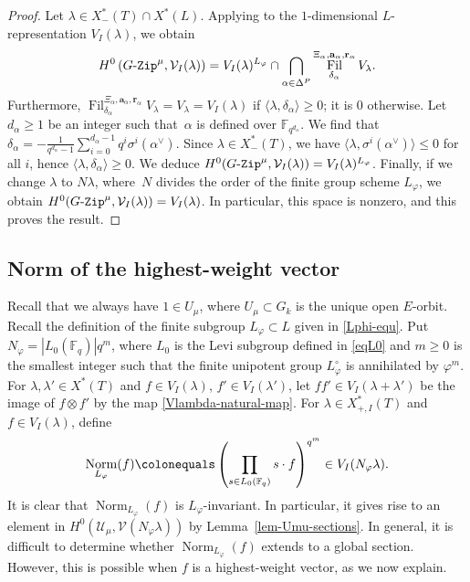 \documentclass[11pt]{amsart}
\numberwithin{equation}{section}
\theoremstyle{definition}
\theoremstyle{remark}
\newcommand{\GZip}{\mathop{\text{$G$-{\tt Zip}}}\nolimits}
\newcommand{\Ucal}{{\mathcal U}}
\newcommand{\Vcal}{{\mathcal V}}
\newcommand{\FF}{\mathbb{F}}
\DeclareMathOperator{\fil}{Fil}
\DeclareMathOperator{\Norm}{Norm}
\begin{document}
\begin{proof}
Let $\lambda \in X^*_{-}(T) \cap X^*(L)$. Applying \cite[Theorem 3.4.1]{Imai-Koskivirta-vector-bundles} to the $1$-dimensional $L$-representation $V_I(\lambda)$, we obtain 
\begin{equation}
H^0\left(\GZip^\mu,\Vcal_I(\lambda)\right)=V_I(\lambda)^{L_{\varphi}}\cap 
 \bigcap_{\alpha \in \Delta^P} 
 \fil_{\delta_{\alpha}}^{\Xi_{\alpha},\mathbf{a}_{\alpha},\mathbf{r}_{\alpha}} V_{\lambda}.
\end{equation}
Furthermore, $\fil_{\delta_{\alpha}}^{\Xi_{\alpha},\mathbf{a}_{\alpha},\mathbf{r}_{\alpha}} V_{\lambda}=V_\lambda=V_I(\lambda)$ if $\langle \lambda, \delta_\alpha \rangle \geq 0$; it is $0$ otherwise. Let $d_\alpha\geq 1$ be an integer such that~$\alpha$ is defined over $\FF_{q^{d_\alpha}}$. We find that $\delta_\alpha=-\frac{1}{q^{d_\alpha}-1}\sum_{i=0}^{d_\alpha-1} q^i \sigma^i(\alpha^\vee)$. Since $\lambda\in X^*_{-}(T)$, we have $\langle \lambda , \sigma^{i}(\alpha^\vee) \rangle \leq 0$ for all $i$, hence $\langle \lambda, \delta_\alpha \rangle \geq 0$. We deduce  $H^0(\GZip^\mu,\Vcal_I(\lambda))=V_I(\lambda)^{L_{\varphi}}$. Finally, if we change $\lambda$ to $N\lambda$, where~$N$ divides the order of the finite group scheme $L_\varphi$, we obtain $H^0(\GZip^\mu,\Vcal_I(\lambda))=V_I(\lambda)$. In particular, this space is nonzero, and this proves the result.
\end{proof}

\subsection{Norm of the highest-weight vector}\label{subsec-norm}

Recall that we always have $1\in U_\mu$, where $U_{\mu}\subset G_k$ is the unique open $E$-orbit. Recall the definition of the finite subgroup $L_\varphi\subset L$ given in \eqref{Lphi-equ}. Put $N_\varphi=|L_0(\FF_q)|q^m$, where $L_0$ is the Levi subgroup defined in \eqref{eqL0} and $m\geq 0$ is the smallest integer such that the finite unipotent group $L_\varphi^{\circ}$ is annihilated by $\varphi^m$. For $\lambda,\lambda'\in X^*(T)$ and $f\in V_I(\lambda)$, $f'\in V_I(\lambda')$, let $ff'\in V_I(\lambda+\lambda')$ be the image of $f\otimes f'$ by the map \eqref{Vlambda-natural-map}. For $\lambda\in X^*_{+,I}(T)$ and $f\in V_I(\lambda)$, define
\begin{equation} \label{norm-def-eq}
\Norm_{L_\varphi}(f)\colonequals \left(\prod_{s\in L_0(\FF_q)}s\cdot f \right)^{q^m}\in V_I(N_\varphi \lambda).
\end{equation}
It is clear that $\Norm_{L_\varphi}(f)$ is $L_\varphi$-invariant. In particular, it gives rise to an element in $H^0(\Ucal_\mu,\Vcal(N_\varphi \lambda))$ by Lemma~\ref{lem-Umu-sections}. In general, it is difficult to determine whether $\Norm_{L_\varphi}(f)$ extends to a global section. However, this is possible when $f$ is a highest-weight vector, as we now explain.
\end{document}

